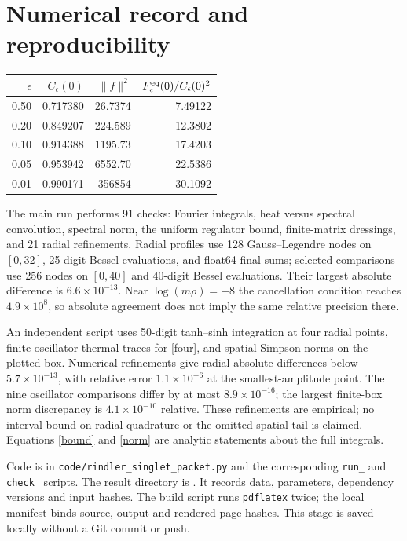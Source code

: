 \documentclass[11pt,a4paper]{article}
\begin{document}
\section{Numerical record and reproducibility}
\begin{center}
\begin{tabular}{rrrr}
\toprule
$\epsilon$ & $C_\epsilon(0)$ & $\|f\|^2$ & $F^{\rm eq}_\epsilon(0)/C_\epsilon(0)^2$\\
\midrule
0.50 & 0.717380 & 26.7374 & 7.49122\\
0.20 & 0.849207 & 224.589 & 12.3802\\
0.10 & 0.914388 & 1195.73 & 17.4203\\
0.05 & 0.953942 & 6552.70 & 22.5386\\
0.01 & 0.990171 & 356854 & 30.1092\\
\bottomrule
\end{tabular}
\end{center}
The main run performs 91 checks: Fourier integrals, heat versus
spectral convolution, spectral norm, the uniform regulator bound,
finite-matrix dressings, and 21 radial refinements. Radial profiles
use 128 Gauss--Legendre nodes on $[0,32]$, 25-digit Bessel evaluations,
and float64 final sums; selected comparisons use 256 nodes on $[0,40]$
and 40-digit Bessel evaluations. Their largest absolute difference
is $6.6\times10^{-13}$. Near $\log(m\rho)=-8$ the cancellation condition
reaches $4.9\times10^8$, so absolute agreement does not imply the same
relative precision there.

An independent script uses 50-digit tanh--sinh integration at four
radial points, finite-oscillator thermal traces for \eqref{four},
and spatial Simpson norms on the plotted box. Numerical refinements
give radial absolute differences below $5.7\times10^{-13}$, with relative
error $1.1\times10^{-6}$ at the smallest-amplitude point. The nine oscillator
comparisons differ by at most $8.9\times10^{-16}$; the largest finite-box
norm discrepancy is $4.1\times10^{-10}$ relative. These refinements
are empirical; no interval bound on radial quadrature or the omitted
spatial tail is claimed. Equations \eqref{bound} and \eqref{norm} are
analytic statements about the full integrals.

Code is in \texttt{code/rindler\_singlet\_packet.py} and the corresponding
\texttt{run\_} and \texttt{check\_} scripts. The result directory is
. It records data, parameters,
dependency versions and input hashes. The build script runs
\texttt{pdflatex} twice; the local manifest binds source, output and
rendered-page hashes. This stage is saved locally without a Git commit
or push.
\end{document}
